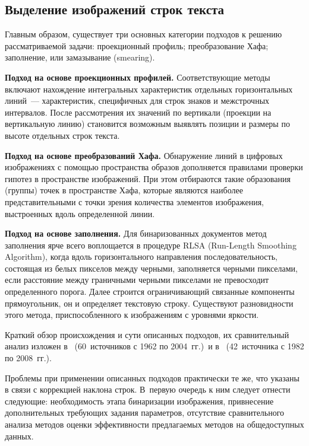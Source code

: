 \begin{multicols}{2}
\section{Выделение изображений строк текста}
      
      Главным образом, существует три основных категории подходов к решению 
рассматриваемой задачи: проекционный профиль; преобразование Хафа; заполнение, или 
замазывание (smearing).
      
      \smallskip
      
      \textbf{Подход на основе проекционных профилей.} Соответствующие методы 
включают нахождение интегральных характеристик отдельных горизонтальных линий~--- 
характеристик, специфичных для строк знаков и межстрочных интервалов. После 
рассмотрения их значений по вертикали (проекции на вертикальную линию) становится 
возможным выявлять позиции и размеры по высоте отдельных строк текста.
      
      \smallskip
      
      \textbf{Подход на основе преобразований Хафа.} Обнаружение линий в 
цифровых изображениях с помощью пространства образов дополняется правилами 
проверки гипотез в пространстве изображений. При этом отбираются такие образования 
(группы) точек в пространстве Хафа, которые являются наиболее представительными с 
точки зрения количества элементов изображения, выстроенных вдоль определенной 
линии.
      
      \smallskip
      
      \textbf{Подход на основе заполнения.} Для бинаризо\-ванных документов метод 
заполнения ярче всего воплощается в процедуре RLSA (Run-Length Smoothing Algorithm), 
когда вдоль горизонтального на\-прав\-ле\-ния последовательность, состоящая из белых 
пикселов между черными, заполняется черными пикселами, если расстояние между 
граничными черными пикселами не превосходит определенного порога. Далее строится 
ограничивающий связанные компоненты прямоугольник, он и определяет текстовую 
строку. Существуют разновидности этого метода, приспособленного к изображениям с 
уровнями яркости.
      
      Краткий обзор происхождения и сути описанных подходов, их сравнительный 
анализ изложен в~\cite{3-kr} (60~источников с 1962 по 2004~гг.)\ и в~\cite{4-kr} 
(42~источника с 1982 по 2008~гг.).
      
      Проблемы при применении описанных подходов практически те же, что указаны в 
связи с коррекцией наклона строк. В~первую очередь к ним следует отнести следующие: 
необходимость этапа бинаризации изображения, привнесение дополнительных 
требующих задания параметров, отсутствие сравнительного анализа методов оценки 
эффективности предлагаемых методов на общедоступных данных. 
      

\end{multicols}
